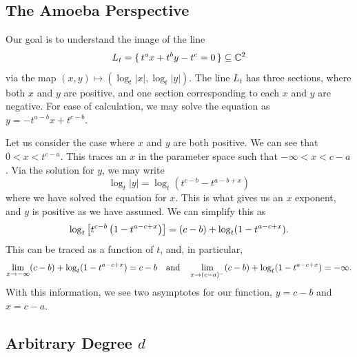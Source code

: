 \documentclass[12pt]{memoir}
\theoremstyle{definition}
\begin{document}
\subsection{The Amoeba Perspective}%

Our goal is to understand the image of the line 
$$L_t=\{\,t^ax+t^by-t^c=0\,\}\subseteq\mathbb{C}^2$$
via the map $(x,y)\mapsto (\log_t|x|,\log_t|y|)$. The line $L_t$ has three sections, where both $x$ and $y$ are positive, and one section corresponding to each $x$ and $y$ are negative. For ease of calculation, we may solve the equation as $y=-t^{a-b}x+t^{c-b}.$\par 
Let us consider the case where $x$ and $y$ are both positive. We can see that $0<x<t^{c-a}$. This traces an $x$ in the parameter space such that $-\infty<x<c-a$. Via the solution for $y$, we may write 
$$\log_t|y|=\log_t(t^{c-b}-t^{a-b+x})$$
where we have solved the equation for $x$. This is what gives us an $x$ exponent, and $y$ is positive as we have assumed. We can simplify this as 
$$\log_t\left\lbrack t^{c-b}\left(1-t^{a-c+x}\right)\right\rbrack=(c-b)+\log_t(1-t^{a-c+x}).$$
This can be traced as a function of $t$, and, in particular,
$$\lim_{x\to-\infty}(c-b)+\log_t(1-t^{a-c+x})=c-b\quad\text{and}\quad\lim_{x\to(c-a)^{-}}(c-b)+\log_t(1-t^{a-c+x})=-\infty.$$
With this information, we see two asymptotes for our function, $y=c-b$ and $x=c-a$.

\subsection{Arbitrary Degree $d$}
\end{document}
